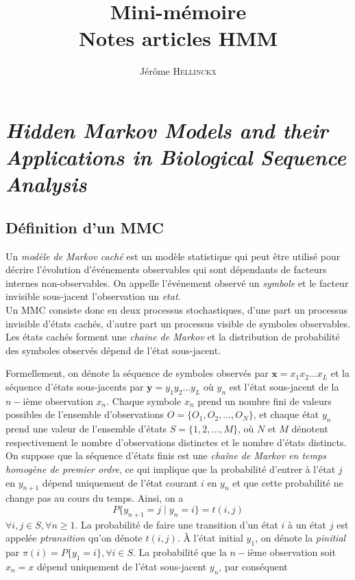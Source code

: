 \documentclass[a4paper, 11pt]{article}
\title{{Mini-mémoire}\\Notes articles HMM}
\author{Jérôme \textsc{Hellinckx}}
\begin{document}
\renewcommand{\labelitemi}{$\bullet$}

\maketitle
\tableofcontents
\glsaddall
\printglossaries
\newpage
\section{\textit{Hidden Markov Models and their Applications in Biological Sequence Analysis}}
\subsection{Définition d'un MMC}
Un \textit{modèle de Markov caché} est un modèle statistique qui peut être utilisé pour décrire l'évolution d'événements observables qui sont dépendants de facteurs internes non-observables. On appelle l'événement observé un \textit{\gls{symbole}} et le facteur invisible sous-jacent l'observation un \textit{\gls{etat}}. 
\\Un MMC consiste donc en deux processus stochastiques, d'une part un processus invisible d'états cachés, d'autre part un processus visible de symboles observables. Les états cachés forment une \textit{\gls{chaine de Markov}} et la distribution de probabilité des symboles observés dépend de l'état sous-jacent. 
\\
\par
Formellement, on dénote la séquence de symboles observés par $\textbf{x} = x_1x_2\dotsc x_L $ et la séquence d'états sous-jacents par  $\textbf{y} = y_1y_2\dotsc y_L $ où $y_n$ est l'état sous-jacent de la $n-$ième observation $x_n$.
Chaque symbole $x_n$ prend un nombre fini de valeurs possibles de l'ensemble d'observations $O=\{O_1,O_2,\dotsc ,O_N\}$, et chaque état $y_n$ prend une valeur de l'ensemble d'états $S=\{1,2,\dotsc ,M\}$, où $N$ et $M$ dénotent respectivement le nombre d'observations distinctes et le nombre d'états distincts.
\\
On suppose que la séquence d'états finis est une \textit{chaîne de Markov en temps homogène de premier ordre}, ce qui implique que la probabilité d'entrer à l'état $j$ en $y_{n+1}$ dépend uniquement de l'état courant $i$ en $y_n$ et que cette probabilité ne change pas au cours du temps. Ainsi, on a
\begin{equation}
P\{y_{n+1}=j\mid y_n=i\}=t(i,j)
\end{equation}
$\forall i,j\in S, \forall n\geq 1$. La probabilité de faire une transition d'un état $i$ à un état $j$ est appelée \textit{\gls{ptransition}} qu'on dénote $t(i,j)$. À l'état initial $y_1$, on dénote la \textit{\gls{pinitial}} par $\pi (i)=P\{y_1=i\},\forall i\in S$. La probabilité que la $n-$ième observation soit $x_n=x$ dépend uniquement de l'état sous-jacent $y_n$, par conséquent 
\end{document}
